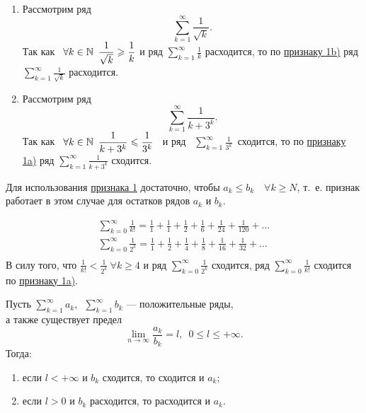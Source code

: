 \documentclass[../../main.tex]{subfiles}
\begin{document}
\begin{examples}

~

\begin{enumerate}
\item
	Рассмотрим ряд
	\[
		 \sum\limits_{k = 1}^\infty\frac{1}{\sqrt{k}}
	.\]
	Так как \  $\forall k \in \mathbb{N} \enspace
	 \dfrac{1}{\sqrt{k}} \geqslant \dfrac{1}{k}$ и ряд 
	 $\displaystyle\sum\limits_{k = 1}^\infty \frac{1}{k}$ расходится,
	то по \hyperref[lec26:comp_test_1]{признаку  1\textdegree b)} ряд
	$\displaystyle\sum\limits_{k = 1}^\infty\frac{1}{\sqrt{k}}$ расходится.
\item
	Рассмотрим ряд
	\[
		 \sum\limits_{k = 1}^\infty\frac{1}{k + 3^k}
	.\]
	Так как \  $\forall k \in \mathbb{N} \enspace
	 \dfrac{1}{{k + 3^k}} \leqslant \dfrac{1}{3^k}$ \  и ряд 
	\ $\displaystyle\sum\limits_{k = 1}^\infty \frac{1}{3^k}$\   сходится,
	то по \hyperref[lec26:comp_test_1]{признаку  1\textdegree a)} ряд
	$\displaystyle \sum\limits_{k = 1}^\infty\frac{1}{k + 3^k}$ сходится.
\end{enumerate}
\end{examples}
\begin{rem}
Для использования \hyperref[lec26:comp_test_1]{признака  1\textdegree} 
достаточно, чтобы $a_k \leq b_k\quad \forall k\geq N$, т.~е.
признак работает в этом случае для остатков рядов $a_k$ и $b_k$. 
 \end{rem}
\begin{example}
\begin{gather*}
	\sum\limits_{k = 0}^\infty\frac{1}{k!} = \frac{1}{1} + 
	\frac{1}{1} +  \frac{1}{2} +  \frac{1}{6} +
	\frac{1}{24} +  \frac{1}{120} + \ldots\\
	\sum\limits_{k = 0}^\infty\frac{1}{2^k} = \frac{1}{1} + 
	\frac{1}{2} +  \frac{1}{4} +  \frac{1}{8} +
	\frac{1}{16} +  \frac{1}{32} + \ldots\\
\end{gather*}
	В силу того, что
	$\displaystyle\frac{1}{k!} < \frac{1}{2^k} \  \forall k \geq 4$
	и ряд $\displaystyle\sum\limits_{k = 0}^\infty\frac{1}{2^k}$ сходится,
	ряд $\displaystyle\sum\limits_{k = 0}^\infty\frac{1}{k!}$ сходится по
	 \hyperref[lec26:comp_test_1]{признаку  1\textdegree a)}.
\end{example}
  \begin{thm}
 	\label{lec26:comp_test_2}
 	Пусть $\sum\limits_{k = 1}^\infty a_k,
 	\enspace \sum\limits_{k = 1}^\infty b_k$
 	 --- положительные ряды,\\ 
 	а также существует предел
 	\[
 	\lim\limits_{n \to \infty}\frac{a_k}{b_k} = l,\enspace 0 \leq l \leq +\infty
 	.\]
	Тогда:
	\begin{enumerate}[label={\alph*)}]
	\item если $l < +\infty$ и $b_k$ сходится, то сходится и $a_k$;
	\item если $l > 0$ и $b_k$ расходится, то расходится и $a_k$.
	\end{enumerate}
 \end{thm}
\end{document}
